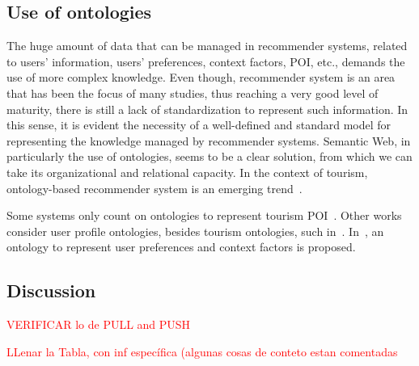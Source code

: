 
\subsection{Use of ontologies}

The huge amount of data that can be managed in recommender systems, related to users' information, users' preferences, context factors, POI, etc.,   demands the use of more complex knowledge. Even though, recommender system is an area that has been the focus of many studies, thus reaching a very good level of maturity, there is still a lack of standardization to represent such information. In this sense, it is evident the necessity of a well-defined and standard model for representing the knowledge managed by recommender systems. Semantic Web, in particularly the use of ontologies, seems to be a clear solution, from which we can take its organizational and relational capacity.
In the context of tourism, ontology-based  recommender  system  is  an  emerging  trend~\cite{borras2014intelligent,yochum2020linked}.

Some systems only count on ontologies to represent tourism  POI~\cite{rajaonarivo2019rec,bahramian_abbaspour_claramunt_2017,garcia2009speta,arigi2018context}. Other works consider user profile ontologies, besides tourism ontologies, such in~\cite{ruotsalo2013smartmuseum}. In~\cite{alonso2012ontology}, an ontology to represent user preferences and context factors is proposed.






\subsection{Discussion}

\textcolor{red}{VERIFICAR lo de PULL and PUSH}

\textcolor{red}{LLenar la Tabla, con inf específica (algunas cosas de conteto estan comentadas}

